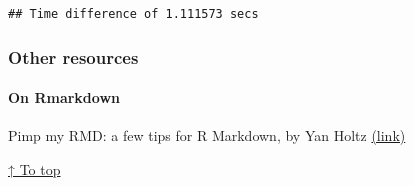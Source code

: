 \documentclass[]{article}
\let\oldparagraph\paragraph
\renewcommand{\paragraph}[1]{\oldparagraph{#1}\mbox{}}
\begin{document}
\begin{verbatim}
## Time difference of 1.111573 secs
\end{verbatim}

\hypertarget{other-resources}{\subsubsection{Other
resources}\label{other-resources}}

\hypertarget{Rmarkdown-resource}{\paragraph{On
Rmarkdown}\label{Rmarkdown-resource}}

Pimp my RMD: a few tips for R Markdown, by Yan Holtz
\href{https://holtzy.github.io/Pimp-my-rmd/}{(link)}

\protect\hyperlink{contents}{↑ To top}
\end{document}
